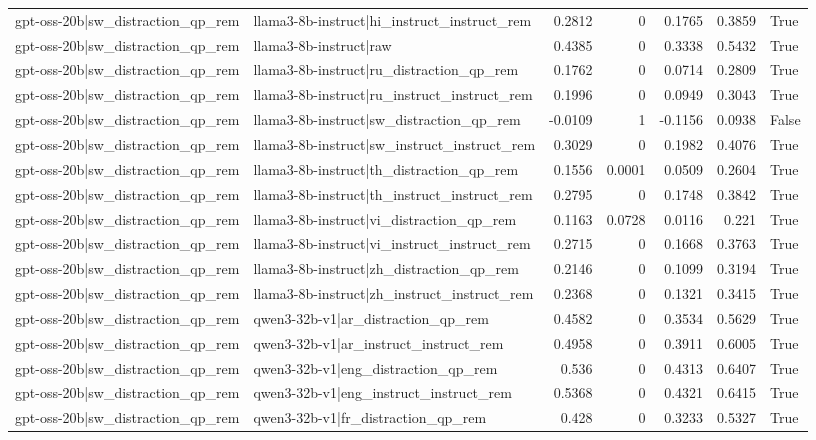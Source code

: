\begin{table}
\begin{tabular}{l l r r r r l}
gpt-oss-20b|sw_distraction_qp_rem & llama3-8b-instruct|hi_instruct_instruct_rem & 0.2812 & 0 & 0.1765 & 0.3859 & True \\
gpt-oss-20b|sw_distraction_qp_rem & llama3-8b-instruct|raw & 0.4385 & 0 & 0.3338 & 0.5432 & True \\
gpt-oss-20b|sw_distraction_qp_rem & llama3-8b-instruct|ru_distraction_qp_rem & 0.1762 & 0 & 0.0714 & 0.2809 & True \\
gpt-oss-20b|sw_distraction_qp_rem & llama3-8b-instruct|ru_instruct_instruct_rem & 0.1996 & 0 & 0.0949 & 0.3043 & True \\
gpt-oss-20b|sw_distraction_qp_rem & llama3-8b-instruct|sw_distraction_qp_rem & -0.0109 & 1 & -0.1156 & 0.0938 & False \\
gpt-oss-20b|sw_distraction_qp_rem & llama3-8b-instruct|sw_instruct_instruct_rem & 0.3029 & 0 & 0.1982 & 0.4076 & True \\
gpt-oss-20b|sw_distraction_qp_rem & llama3-8b-instruct|th_distraction_qp_rem & 0.1556 & 0.0001 & 0.0509 & 0.2604 & True \\
gpt-oss-20b|sw_distraction_qp_rem & llama3-8b-instruct|th_instruct_instruct_rem & 0.2795 & 0 & 0.1748 & 0.3842 & True \\
gpt-oss-20b|sw_distraction_qp_rem & llama3-8b-instruct|vi_distraction_qp_rem & 0.1163 & 0.0728 & 0.0116 & 0.221 & True \\
gpt-oss-20b|sw_distraction_qp_rem & llama3-8b-instruct|vi_instruct_instruct_rem & 0.2715 & 0 & 0.1668 & 0.3763 & True \\
gpt-oss-20b|sw_distraction_qp_rem & llama3-8b-instruct|zh_distraction_qp_rem & 0.2146 & 0 & 0.1099 & 0.3194 & True \\
gpt-oss-20b|sw_distraction_qp_rem & llama3-8b-instruct|zh_instruct_instruct_rem & 0.2368 & 0 & 0.1321 & 0.3415 & True \\
gpt-oss-20b|sw_distraction_qp_rem & qwen3-32b-v1|ar_distraction_qp_rem & 0.4582 & 0 & 0.3534 & 0.5629 & True \\
gpt-oss-20b|sw_distraction_qp_rem & qwen3-32b-v1|ar_instruct_instruct_rem & 0.4958 & 0 & 0.3911 & 0.6005 & True \\
gpt-oss-20b|sw_distraction_qp_rem & qwen3-32b-v1|eng_distraction_qp_rem & 0.536 & 0 & 0.4313 & 0.6407 & True \\
gpt-oss-20b|sw_distraction_qp_rem & qwen3-32b-v1|eng_instruct_instruct_rem & 0.5368 & 0 & 0.4321 & 0.6415 & True \\
gpt-oss-20b|sw_distraction_qp_rem & qwen3-32b-v1|fr_distraction_qp_rem & 0.428 & 0 & 0.3233 & 0.5327 & True \\

\end{tabular}
\end{table}
